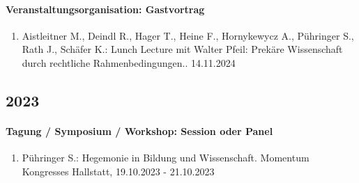 \paragraph{Veranstaltungsorganisation: Gastvortrag}
\begin{enumerate}[leftmargin=*, labelsep=0.5cm]
\item Aistleitner M., Deindl R., Hager T., Heine F., Hornykewycz A., Pühringer S., Rath J., Schäfer K.: Lunch Lecture mit Walter Pfeil: Prekäre Wissenschaft durch rechtliche Rahmenbedingungen.. 14.11.2024
\end{enumerate}\subsection*{2023}\paragraph{Tagung / Symposium / Workshop: Session oder Panel}
\begin{enumerate}[leftmargin=*, labelsep=0.5cm]
\item Pühringer S.: Hegemonie in Bildung und Wissenschaft. Momentum Kongresses Hallstatt, 19.10.2023 - 21.10.2023
\end{enumerate}
